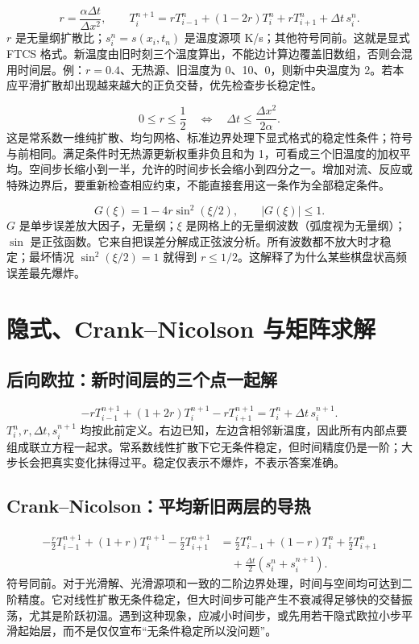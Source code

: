 \begin{equation}
r=\frac{\alpha\Delta t}{\Delta x^2},\qquad
T_i^{n+1}=rT_{i-1}^n+(1-2r)T_i^n+rT_{i+1}^n+\Delta t\,s_i^n.
\end{equation}
$r$ 是无量纲扩散比；$s_i^n=s(x_i,t_n)$ 是温度源项 K/s；其他符号同前。这就是显式 FTCS 格式。新温度由旧时刻三个温度算出，不能边计算边覆盖旧数组，否则会混用时间层。例：$r=0.4$、无热源、旧温度为 0、10、0，则新中央温度为 2。若本应平滑扩散却出现越来越大的正负交替，优先检查步长稳定性。

\begin{equation}
0\leq r\leq\frac12\quad\Longleftrightarrow\quad
\Delta t\leq\frac{\Delta x^2}{2\alpha}.
\end{equation}
这是常系数一维纯扩散、均匀网格、标准边界处理下显式格式的稳定性条件；符号与前相同。满足条件时无热源更新权重非负且和为 1，可看成三个旧温度的加权平均。空间步长缩小到一半，允许的时间步长会缩小到四分之一。增加对流、反应或特殊边界后，要重新检查相应约束，不能直接套用这一条作为全部稳定条件。

\begin{equation}
G(\xi)=1-4r\sin^2(\xi/2),\qquad |G(\xi)|\leq1.
\end{equation}
$G$ 是单步误差放大因子，无量纲；$\xi$ 是网格上的无量纲波数（弧度视为无量纲）；$\sin$ 是正弦函数。它来自把误差分解成正弦波分析。所有波数都不放大时才稳定；最坏情况 $\sin^2(\xi/2)=1$ 就得到 $r\leq1/2$。这解释了为什么某些棋盘状高频误差最先爆炸。

\section{隐式、Crank--Nicolson 与矩阵求解}
\subsection{后向欧拉：新时间层的三个点一起解}
\begin{equation}
-rT_{i-1}^{n+1}+(1+2r)T_i^{n+1}-rT_{i+1}^{n+1}
=T_i^n+\Delta t\,s_i^{n+1}.
\end{equation}
$T_i^n,r,\Delta t,s_i^{n+1}$ 均按此前定义。右边已知，左边含相邻新温度，因此所有内部点要组成联立方程一起求。常系数线性扩散下它无条件稳定，但时间精度仍是一阶；大步长会把真实变化抹得过平。稳定仅表示不爆炸，不表示答案准确。

\subsection{Crank--Nicolson：平均新旧两层的导热}
\begin{align}
-\frac r2T_{i-1}^{n+1}+(1+r)T_i^{n+1}-\frac r2T_{i+1}^{n+1}
&=\frac r2T_{i-1}^n+(1-r)T_i^n+\frac r2T_{i+1}^n\\
&\quad+\frac{\Delta t}{2}(s_i^n+s_i^{n+1}).
\end{align}
符号同前。对于光滑解、光滑源项和一致的二阶边界处理，时间与空间均可达到二阶精度。它对线性扩散无条件稳定，但大时间步可能产生不衰减得足够快的交替振荡，尤其是阶跃初温。遇到这种现象，应减小时间步，或先用若干隐式欧拉小步平滑起始层，而不是仅仅宣布“无条件稳定所以没问题”。

